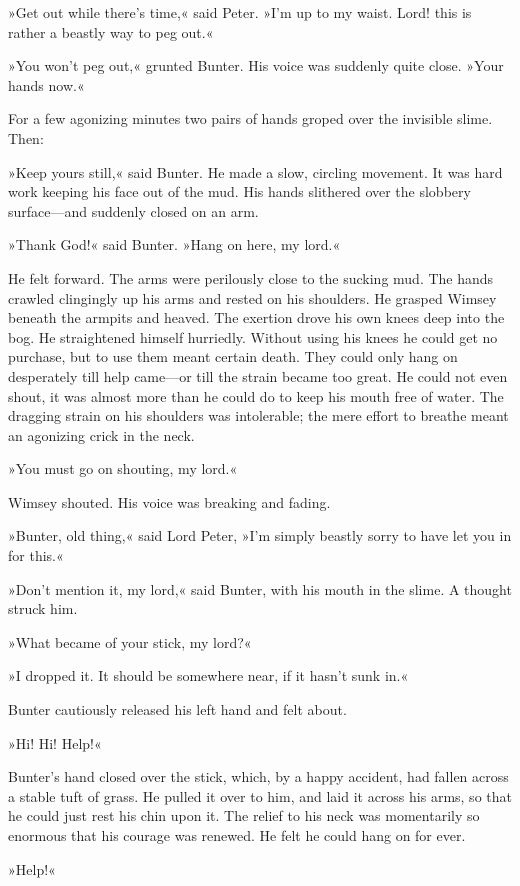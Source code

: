»Get out while there's time,« said Peter. »I'm up to my waist. Lord!  this is rather a beastly way to peg out.«

»You won't peg out,« grunted Bunter. His voice was suddenly quite close. »Your hands now.«

For a few agonizing minutes two pairs of hands groped over the invisible slime. Then:

»Keep yours still,« said Bunter. He made a slow, circling movement. It was hard work keeping his face out of the mud. His hands slithered over the slobbery surface—and suddenly closed on an arm.

»Thank God!« said Bunter. »Hang on here, my lord.«

He felt forward. The arms were perilously close to the sucking mud. The hands crawled clingingly up his arms and rested on his shoulders. He grasped Wimsey beneath the armpits and heaved. The exertion drove his own knees deep into the bog. He straightened himself hurriedly. Without using his knees he could get no purchase, but to use them meant certain death. They could only hang on desperately till help came—or till the strain became too great. He could not even shout, it was almost more than he could do to keep his mouth free of water. The dragging strain on his shoulders was intolerable; the mere effort to breathe meant an agonizing crick in the neck.

»You must go on shouting, my lord.«

Wimsey shouted. His voice was breaking and fading.

»Bunter, old thing,« said Lord Peter, »I'm simply beastly sorry to have let you in for this.«

»Don't mention it, my lord,« said Bunter, with his mouth in the slime.  A thought struck him.

»What became of your stick, my lord?«

»I dropped it. It should be somewhere near, if it hasn't sunk in.«

Bunter cautiously released his left hand and felt about.

»Hi! Hi! Help!«

Bunter's hand closed over the stick, which, by a happy accident, had fallen across a stable tuft of grass. He pulled it over to him, and laid it across his arms, so that he could just rest his chin upon it.  The relief to his neck was momentarily so enormous that his courage was renewed. He felt he could hang on for ever.

»Help!« 

